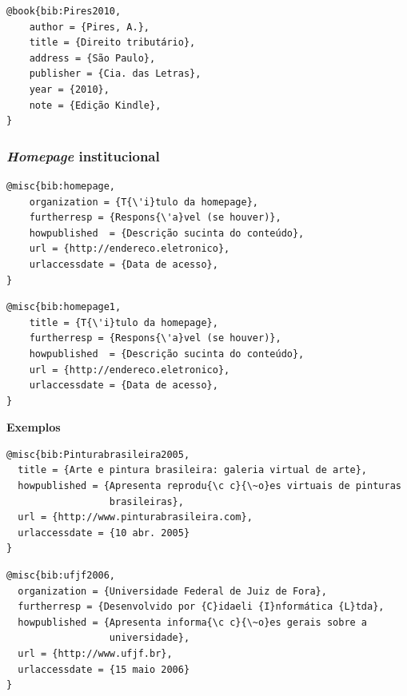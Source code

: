 \documentclass[a4paper,12pt,oneside,onecolumn,final,fleqn]{repUERJ}
\begin{document}
\noindent{}

\begin{verbatim}
@book{bib:Pires2010,
    author = {Pires, A.},
    title = {Direito tributário},
    address = {São Paulo},
    publisher = {Cia. das Letras},
    year = {2010},
    note = {Edição Kindle},
}
\end{verbatim}

\subsubsection{\textsl{Homepage} institucional}

\noindent{}

\begin{verbatim}
@misc{bib:homepage,
    organization = {T{\'i}tulo da homepage},
    furtherresp = {Respons{\'a}vel (se houver)},
    howpublished  = {Descrição sucinta do conteúdo},
    url = {http://endereco.eletronico},
    urlaccessdate = {Data de acesso},
}
\end{verbatim}

\noindent{}

\begin{verbatim}
@misc{bib:homepage1,
    title = {T{\'i}tulo da homepage},
    furtherresp = {Respons{\'a}vel (se houver)},
    howpublished  = {Descrição sucinta do conteúdo},
    url = {http://endereco.eletronico},
    urlaccessdate = {Data de acesso},
}
\end{verbatim}
\noindent\textbf{Exemplos}\\

\noindent{}

\begin{verbatim}
@misc{bib:Pinturabrasileira2005,
  title = {Arte e pintura brasileira: galeria virtual de arte},
  howpublished = {Apresenta reprodu{\c c}{\~o}es virtuais de pinturas 
                  brasileiras},
  url = {http://www.pinturabrasileira.com},
  urlaccessdate = {10 abr. 2005}
}
\end{verbatim}

\noindent{}

\begin{verbatim}
@misc{bib:ufjf2006,
  organization = {Universidade Federal de Juiz de Fora},
  furtherresp = {Desenvolvido por {C}idaeli {I}nformática {L}tda},
  howpublished = {Apresenta informa{\c c}{\~o}es gerais sobre a 
                  universidade},
  url = {http://www.ufjf.br},
  urlaccessdate = {15 maio 2006}
}
\end{verbatim}
\end{document}
